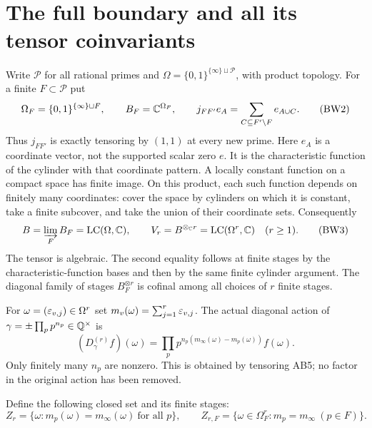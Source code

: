 \section{The full boundary and all its tensor coinvariants}
Write $\mathcal P$ for all rational primes and
$\Omega=\{0,1\}^{\{\infty\}\sqcup\mathcal P}$, with product topology.
For a finite $F\subset\mathcal P$ put
\[
 \Omega_F=\{0,1\}^{\{\infty\}\sqcup F},\qquad
 B_F=\mathbb C^{\Omega_F},\qquad
 j_{FF'}e_A=\sum_{C\subseteq F'\setminus F}e_{A\cup C}.
 \tag{BW2}
\]
Thus $j_{FF'}$ is exactly tensoring by $(1,1)$ at every new prime.
Here $e_A$ is a coordinate vector, not the supported scalar zero $e$.
It is the characteristic function of the cylinder with that coordinate
pattern. A locally constant function on a compact space has finite
image. On this product, each such function depends on finitely many
coordinates: cover the space by cylinders on which it is constant,
take a finite subcover, and take the union of their coordinate sets.
Consequently
\[
 B=\varinjlim_F B_F=\operatorname{LC}(\Omega,\mathbb C),\qquad
 V_r=B^{\otimes_\mathbb C r}=\operatorname{LC}(\Omega^r,\mathbb C)\quad(r\ge1).
 \tag{BW3}
\]
The tensor is algebraic. The second equality follows at finite stages
by the characteristic-function bases and then by the same finite
cylinder argument. The diagonal family of stages $B_F^{\otimes r}$
is cofinal among all choices of $r$ finite stages.

For $\omega=(\varepsilon_{v,j})\in\Omega^r$ set
$m_v(\omega)=\sum_{j=1}^r\varepsilon_{v,j}$. The actual diagonal action of
$\gamma=\pm\prod_pp^{n_p}\in\mathbb Q^\times$ is
\[
 (D_\gamma^{(r)}f)(\omega)=
 \prod_p p^{n_p(m_\infty(\omega)-m_p(\omega))}f(\omega).
 \tag{BW4}
\]
Only finitely many $n_p$ are nonzero. This is obtained by tensoring
AB5; no factor in the original action has been removed.

Define the following closed set and its finite stages:
\[
 Z_r=\{\omega:m_p(\omega)=m_\infty(\omega)\ \text{for all }p\},
 \qquad Z_{r,F}=\{\omega\in\Omega_F^r:m_p=m_\infty\ (p\in F)\}.
 \tag{BW5}
\]

